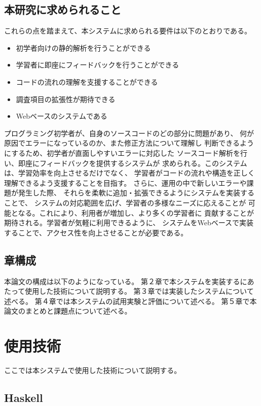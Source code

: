 \documentclass{cssspaper}
\begin{document}
        \section{本研究に求められること}
        これらの点を踏まえて、本システムに求められる要件は以下のとおりである。
        \begin{itemize}
            \item 初学者向けの静的解析を行うことができる
            \item 学習者に即座にフィードバックを行うことができる
            \item コードの流れの理解を支援することができる
            \item 調査項目の拡張性が期待できる
            \item Webベースのシステムである
        \end{itemize}
        プログラミング初学者が、自身のソースコードのどの部分に問題があり、
        何が原因でエラーになっているのか、また修正方法について理解し
        判断できるようにするため、初学者が直面しやすいエラーに対応した
        ソースコード解析を行い、即座にフィードバックを提供するシステムが
        求められる。このシステムは、学習効率を向上させるだけでなく、
        学習者がコードの流れや構造を正しく理解できるよう支援することを目指す。
        さらに、運用の中で新しいエラーや課題が発生した際、
        それらを柔軟に追加・拡張できるようにシステムを実装することで、
        システムの対応範囲を広げ、学習者の多様なニーズに応えることが
        可能となる。これにより、利用者が増加し、より多くの学習者に
        貢献することが期待される。学習者が気軽に利用できるように、
        システムをWebベースで実装することで、アクセス性を向上させることが必要である。

        \section{章構成}
        本論文の構成は以下のようになっている。
        第２章で本システムを実装するにあたって使用した技術について説明する。
        第３章では実装したシステムについて述べる。
        第４章では本システムの試用実験と評価について述べる。
        第５章で本論文のまとめと課題点について述べる。

    \chapter{使用技術}
    ここでは本システムで使用した技術について説明する。

        \section{Haskell}
\end{document}
